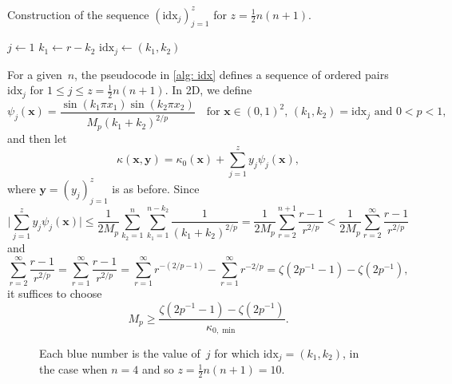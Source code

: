\documentclass[a4paper,12pt]{article}
\newcommand{\bs}[1]{\boldsymbol{#1}}
\newcommand{\idx}{\mathrm{idx}}
\begin{document}
\begin{algorithm}[t]
\caption{Construction of the sequence $(\idx_j)_{j=1}^z$
for $z=\tfrac12n(n+1)$.} \label{alg: idx}
\begin{algorithmic}
\State $j\gets 1$
        \State $k_1\gets r-k_2$
        \State $\idx_j\gets(k_1,k_2)$
    \EndFor
\EndFor
\end{algorithmic}
\end{algorithm}

For a given~$n$, the pseudocode in \cref{alg: idx} defines a sequence
of ordered pairs~$\idx_j$ for $1\le j\le z=\tfrac12n(n+1)$.  In 2D, we define
\[
\psi_j(\bs{x})=\frac{\sin(k_1\pi x_1)\sin(k_2\pi x_2)}{M_p(k_1+k_2)^{2/p}}
\quad\text{for $\bs{x}\in(0,1)^2$, $(k_1,k_2)=\idx_j$ and $0<p<1$,}
\]
and then let
\[
\kappa(\bs{x},\bs{y})=\kappa_0(\bs{x})+\sum_{j=1}^z y_j\psi_j(\bs{x}),
\]
where $\bs{y}=(y_j)_{j=1}^z$ is as before. Since
\[
\biggl|\sum_{j=1}^zy_j\psi_j(\bs{x})\biggr|\le\frac{1}{2M_p}\sum_{k_2=1}^n
    \sum_{k_1=1}^{n-k_2}\frac{1}{(k_1+k_2)^{2/p}}
    =\frac{1}{2M_p}\sum_{r=2}^{n+1}\frac{r-1}{r^{2/p}}
    <\frac{1}{2M_p}\sum_{r=2}^\infty\frac{r-1}{r^{2/p}}
\]
and
\[
\sum_{r=2}^\infty\frac{r-1}{r^{2/p}}=\sum_{r=1}^\infty\frac{r-1}{r^{2/p}}
    =\sum_{r=1}^\infty r^{-(2/p-1)}
    -\sum_{r=1}^\infty r^{-2/p}
    =\zeta(2p^{-1}-1)-\zeta(2p^{-1}),
\]
it suffices to choose
\[
M_p\ge\frac{\zeta(2p^{-1}-1)-\zeta(2p^{-1})}{\kappa_{0,\min}}.
\]




\begin{figure}
\caption{Each blue number is the value of~$j$ for which $\idx_j=(k_1,k_2)$, in
the case when $n=4$ and so $z=\tfrac12n(n+1)=10$.}
\label{fig: idx}
\begin{center}
\end{center}
\end{figure}
\end{document}
